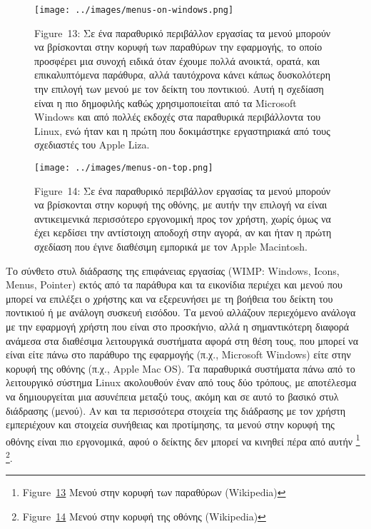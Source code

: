\documentclass[
]{article}
\begin{document}
\leavevmode{}%
\begin{figure}
\hypertarget{fig:menus-on-windows}{%
\centering
\texttt{[image: ../images/menus-on-windows.png]}
\caption{Figure~13: Σε ένα παραθυρικό περιβάλλον εργασίας τα μενού
μπορούν να βρίσκονται στην κορυφή των παραθύρων την εφαρμογής, το οποίο
προσφέρει μια συνοχή ειδικά όταν έχουμε πολλά ανοικτά, ορατά, και
επικαλυπτόμενα παράθυρα, αλλά ταυτόχρονα κάνει κάπως δυσκολότερη την
επιλογή των μενού με τον δείκτη του ποντικιού. Αυτή η σχεδίαση είναι η
πιο δημοφιλής καθώς χρησιμοποιείται από τα Microsoft Windows και από
πολλές εκδοχές στα παραθυρικά περιβάλλοντα του Linux, ενώ ήταν και η
πρώτη που δοκιμάστηκε εργαστηριακά από τους σχεδιαστές του Apple
Liza.}\label{fig:menus-on-windows}
}
\end{figure}

\leavevmode{}%
\begin{figure}
\hypertarget{fig:menus-on-top}{%
\centering
\texttt{[image: ../images/menus-on-top.png]}
\caption{Figure~14: Σε ένα παραθυρικό περιβάλλον εργασίας τα μενού
μπορούν να βρίσκονται στην κορυφή της οθόνης, με αυτήν την επιλογή να
είναι αντικειμενικά περισσότερο εργονομική προς τον χρήστη, χωρίς όμως
να έχει κερδίσει την αντίστοιχη αποδοχή στην αγορά, αν και ήταν η πρώτη
σχεδίαση που έγινε διαθέσιμη εμπορικά με τον Apple
Macintosh.}\label{fig:menus-on-top}
}
\end{figure}

Το σύνθετο στυλ διάδρασης της επιφάνειας εργασίας (WIMP: Windows, Icons,
Menus, Pointer) εκτός από τα παράθυρα και τα εικονίδια περιέχει και
μενού που μπορεί να επιλέξει ο χρήστης και να εξερευνήσει με τη βοήθεια
του δείκτη του ποντικιού ή με ανάλογη συσκευή εισόδου. Τα μενού αλλάζουν
περιεχόμενο ανάλογα με την εφαρμογή χρήστη που είναι στο προσκήνιο, αλλά
η σημαντικότερη διαφορά ανάμεσα στα διαθέσιμα λειτουργικά συστήματα
αφορά στη θέση τους, που μπορεί να είναι είτε πάνω στο παράθυρο της
εφαρμογής (π.χ., Microsoft Windows) είτε στην κορυφή της οθόνης (π.χ.,
Apple Mac OS). Τα παραθυρικά συστήματα πάνω από το λειτουργικό σύστημα
Linux ακολουθούν έναν από τους δύο τρόπους, με αποτέλεσμα να
δημιουργείται μια ασυνέπεια μεταξύ τους, ακόμη και σε αυτό το βασικό
στυλ διάδρασης (μενού). Αν και τα περισσότερα στοιχεία της διάδρασης με
τον χρήστη εμπεριέχουν και στοιχεία συνήθειας και προτίμησης, τα μενού
στην κορυφή της οθόνης είναι πιο εργονομικά, αφού ο δείκτης δεν μπορεί
να κινηθεί πέρα από αυτήν \footnote{Figure~\protect\hyperlink{fig:menus-on-windows}{13}
  Μενού στην κορυφή των παραθύρων (Wikipedia)} \footnote{Figure~\protect\hyperlink{fig:menus-on-top}{14}
  Μενού στην κορυφή της οθόνης (Wikipedia)}.
\end{document}
